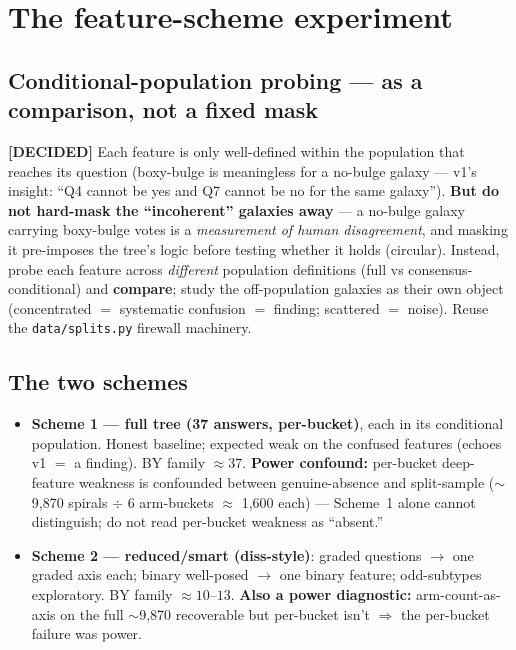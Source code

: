 \documentclass[11pt,a4paper]{article}
\newcommand{\dec}{\textcolor{decided}{\sffamily\bfseries[DECIDED]}}
\begin{document}
\section{The feature-scheme experiment}\label{sec:scheme}


\subsection{Conditional-population probing --- as a comparison, not a fixed mask}

\dec{} Each feature is only well-defined within the population that reaches its question
(boxy-bulge is meaningless for a no-bulge galaxy --- v1's insight: ``Q4 cannot be yes and Q7
cannot be no for the same galaxy''). \textbf{But do not hard-mask the ``incoherent'' galaxies
away} --- a no-bulge galaxy carrying boxy-bulge votes is a \emph{measurement of human
disagreement}, and masking it pre-imposes the tree's logic before testing whether it holds
(circular). Instead, probe each feature across \emph{different} population definitions (full vs
consensus-conditional) and \textbf{compare}; study the off-population galaxies as their own
object (concentrated $=$ systematic confusion $=$ finding; scattered $=$ noise). Reuse the
\texttt{data/splits.py} firewall machinery.

\subsection{The two schemes}

\begin{itemize}[leftmargin=1.4em,itemsep=3pt]
\item \textbf{Scheme 1 --- full tree (37 answers, per-bucket)}, each in its conditional
population. Honest baseline; expected weak on the confused features (echoes v1 $=$ a finding).
BY family $\approx 37$. \textbf{Power confound:} per-bucket deep-feature weakness is confounded
between genuine-absence and split-sample ($\sim$9{,}870 spirals $\div$ 6 arm-buckets
$\approx$ 1{,}600 each) --- Scheme~1 alone cannot distinguish; do not read per-bucket weakness
as ``absent.''
\item \textbf{Scheme 2 --- reduced/smart (diss-style)}: graded questions $\rightarrow$ one
graded axis each; binary well-posed $\rightarrow$ one binary feature; odd-subtypes exploratory.
BY family $\approx 10$--$13$. \textbf{Also a power diagnostic:} arm-count-as-axis on the full
$\sim$9{,}870 recoverable but per-bucket isn't $\Rightarrow$ the per-bucket failure was power.
\end{itemize}
\end{document}
